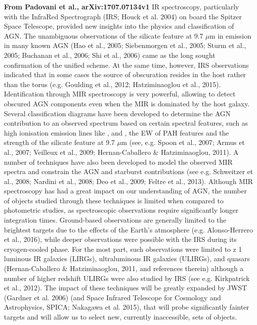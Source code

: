 \smallskip
\smallskip
\noindent
{\bf From Padovani et al.,  arXiv:1707.07134v1}
IR spectroscopy, particularly with the InfraRed Spectrograph (IRS;
Houck et al. 2004) on board the Spitzer Space Telescope, provided new
insights into the physics and classification of AGN. The unambiguous
observations of the silicate feature at 9.7 $\mu$m in emission in many
known AGN (Hao et al., 2005; Siebenmorgen et al., 2005; Sturm et al.,
2005; Buchanan et al., 2006; Shi et al., 2006) came as the long sought
confirmation of the unified scheme. At the same time, however, IRS
observations indicated that in some cases the source of obscuration
resides in the host rather than the torus (e.g. Goulding et al., 2012;
Hatziminaoglou et al., 2015).  Identification through MIR spectroscopy
is very powerful, allowing to detect obscured AGN components even when
the MIR is dominated by the host galaxy. Several classification
diagrams have been developed to determine the AGN contribution to an
observed spectrum based on certain spectral features, such as high
ionisation emission lines like \nev, \neii and \oiv, the EW of PAH
features and the strength of the silicate feature at 9.7 $\mu$m (see,
e.g. Spoon et al., 2007; Armus et al., 2007; Veilleux et al., 2009;
Hernan-Caballero \& Hatziminaoglou, 2011). A number of techniques have
also been developed to model the observed MIR spectra and constrain
the AGN and starburst contributions (see e.g. Schweitzer et al., 2008;
Nardini et al., 2008; Deo et al., 2009; Feltre et al., 2013).
Although MIR spectroscopy has had a great impact on our understanding
of AGN, the number of objects studied through these techniques is
limited when compared to photometric studies, as spectroscopic
observations require significantly longer integration
times. Ground-based observations are generally limited to the
brightest targets due to the effects of the Earth's atmosphere
(e.g. Alonso-Herrero et al., 2016), while deeper observations were
possible with the IRS during its cryogen-cooled phase. For the most
part, such observations were limited to z 1 luminous IR galaxies
(LIRGs), ultraluminous IR galaxies (ULIRGs), and quasars
(Hernan-Caballero \& Hatziminaoglou, 2011, and references therein)
although a number of higher redshift ULIRGs were also studied by IRS
(see e.g. Kirkpatrick et al., 2012). The impact of these techniques
will be greatly expanded by JWST (Gardner et al. 2006)
(and Space Infrared Telescope for Cosmology and Astrophysics, SPICA;
Nakagawa et al. 2015), that will probe significantly fainter targets
and will allow us to select new, currently inaccessible, sets of
objects. 


